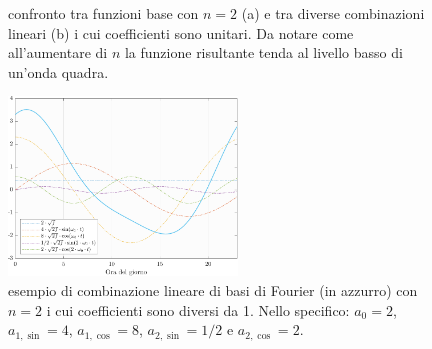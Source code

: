 \begin{figure}[htp]
	\centering
	\quad
	\caption[Confronto tra funzioni base con $n=2$ e tra diverse combinazioni lineari]{confronto tra funzioni base con $n=2$ (a) e tra diverse combinazioni lineari (b) i cui coefficienti sono unitari. Da notare come all'aumentare di $n$ la funzione risultante tenda al livello basso di un'onda quadra.}
	\label{esempi_Fourier}
\end{figure}
\begin{figure}[htp]
	\centering
	\includegraphics[height=180px]{Immagini/1. Modello base/Spline Fourier con coefficienti non unitari}
	\caption[Esempio di combinazione lineare con $n=2$ i cui coefficienti sono diversi da \num{1}]{esempio di combinazione lineare di basi di Fourier (in azzurro) con $n=2$ i cui coefficienti sono diversi da \num{1}. Nello specifico: $a_0 = 2$, $a_{1,\sin} = 4$, $a_{1,\cos} = 8$, $a_{2,\sin} = 1/2$ e $a_{2,\cos} = 2$.}
	\label{esempio_Fourier_coef_non_unitari}
\end{figure}


